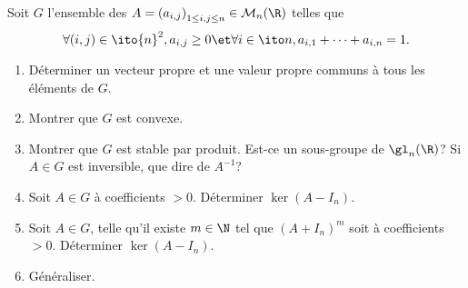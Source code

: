 \begin{enonce}
\begin{exercise}[ID={RMS125 E782, 2014 Centrale MP},subtitle={},tags={}]
Soit $G$ l'ensemble des $A=\left( a_{i,j} \right)_{1\leq i,j\leq n}\in\mathcal{M}_n(\R)$ telles que
\begin{equation*}
  \forall(i,j)\in\ito{n}^2, a_{i,j}\geq 0 \et \forall i\in\ito n, a_{i,1}+\dots+a_{i,n}=1.
\end{equation*}
\begin{enumerate}
  \item Déterminer un vecteur propre et une valeur propre communs à tous les éléments de $G$.
  \item Montrer que $G$ est convexe.
  \item Montrer que $G$ est stable par produit.
    Est-ce un sous-groupe de $\gl_n(\R)$?
    Si $A\in G$ est inversible, que dire de $A^{-1}$?

  \item Soit $A\in G$ à coefficients $>0$.
    Déterminer $\ker(A-I_n)$.
  \item Soit $A\in G$, telle qu'il existe $m\in\N$ tel que $(A+I_n)^m$ soit à coefficients $>0$.
    Déterminer $\ker(A-I_n)$.

  \item Généraliser.  
\end{enumerate}
\end{exercise}
\begin{solution}
\end{solution}
\end{enonce}
